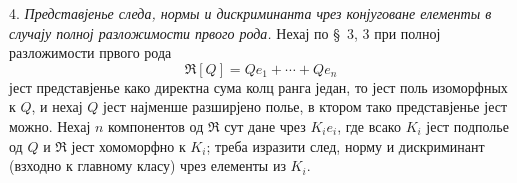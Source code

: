 \documentclass[11pt]{article}
\begin{document}
\setcounter{footnote}{27}

4. \emph{Представјенье следа, нормы и дискриминанта чрез конјуговане елементы в случају полној разложимости првого рода.} Нехај по \S~3, 3 при полној разложимости првого рода
\[
        \mathfrak R[Q]=Qe_1+\cdots+Qe_n
\]
јест представјенье како директна сума колц ранга један, то јест поль изоморфных к $Q$, и нехај $Q$ јест најменше разширјено полье, в ктором тако представјенье јест можно. Нехај $n$ компонентов од $\mathfrak R$ сут дане чрез $K_i e_i$, где всако $K_i$ јест подполье од $Q$ и $\mathfrak R$ јест хомоморфно к $K_i$; треба изразити след, норму и дискриминант (взходно к главному класу) чрез елементы из $K_i$.
\end{document}
